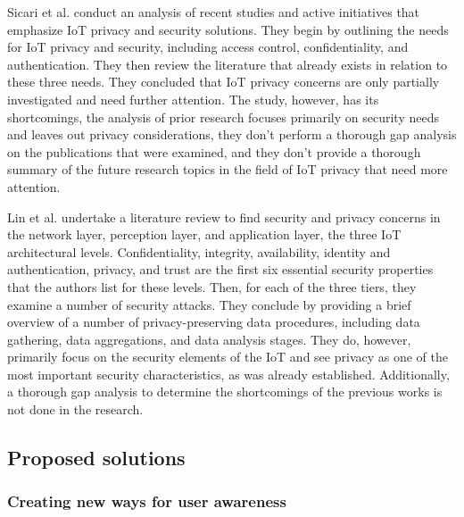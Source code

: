 \documentclass[conference]{IEEEtran}
\begin{document}
Sicari et al. conduct an analysis of recent studies and active initiatives
that emphasize IoT privacy and security solutions. They begin by outlining
the needs for IoT privacy and security, including access control, confidentiality,
and authentication. They then review the literature that already exists in
relation to these three needs. They concluded that IoT privacy
concerns are only partially investigated and need further attention.
The study, however, has its shortcomings, the analysis of
prior research focuses primarily on security needs and leaves out privacy
considerations, they don't perform a thorough gap analysis
on the publications that were examined, and they don't provide
a thorough summary of the future research topics in the field of IoT
privacy that need more attention.

Lin et al. undertake a literature review to find security and privacy
concerns in the network layer, perception layer, and application
layer, the three IoT architectural levels. Confidentiality, integrity,
availability, identity and authentication, privacy, and trust are
the first six essential security properties that the authors list
for these levels. Then, for each of the three tiers, they examine
a number of security attacks. They conclude by providing a brief
overview of a number of privacy-preserving data procedures,
including data gathering, data aggregations, and data analysis stages.
They do, however, primarily focus on the security elements of the
IoT and see privacy as one of the most important security
characteristics, as was already established. Additionally, a
thorough gap analysis to determine the shortcomings of the previous
works is not done in the research.

\subsection{Proposed solutions}

\subsubsection{Creating new ways for user awareness}
\end{document}
